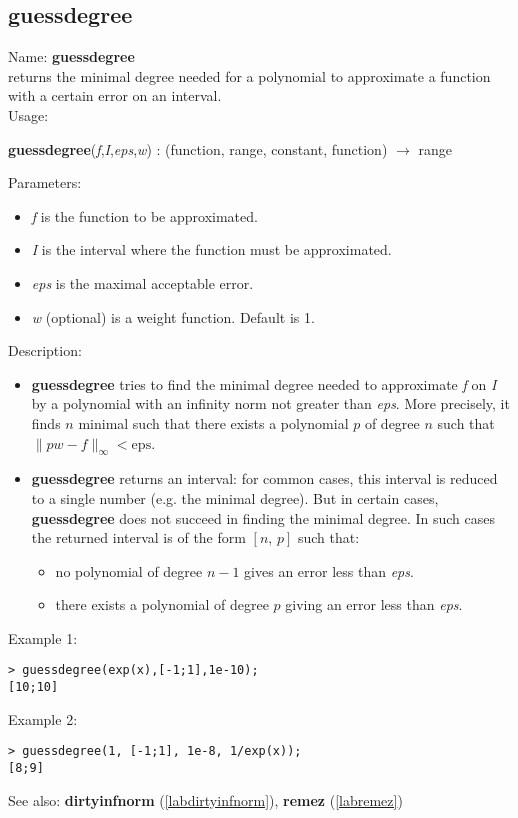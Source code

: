 \subsection{guessdegree}
\label{labguessdegree}
\noindent Name: \textbf{guessdegree}\\
returns the minimal degree needed for a polynomial to approximate a function with a certain error on an interval.\\
\noindent Usage: 
\begin{center}
\textbf{guessdegree}(\emph{f},\emph{I},\emph{eps},\emph{w}) : (\textsf{function}, \textsf{range}, \textsf{constant}, \textsf{function}) $\rightarrow$ \textsf{range}
\end{center}
Parameters: 
\begin{itemize}
\item \emph{f} is the function to be approximated.
\item \emph{I} is the interval where the function must be approximated.
\item \emph{eps} is the maximal acceptable error.
\item \emph{w} (optional) is a weight function. Default is 1.
\end{itemize}
\noindent Description: \begin{itemize}

\item \textbf{guessdegree} tries to find the minimal degree needed to approximate \emph{f}
   on \emph{I} by a polynomial with an infinity norm not greater than \emph{eps}.
   More precisely, it finds $n$ minimal such that there exists a
   polynomial $p$ of degree $n$ such that $\|pw-f\|_{\infty} < \mathrm{eps}$.

\item \textbf{guessdegree} returns an interval: for common cases, this interval is reduced to a 
   single number (e.g. the minimal degree). But in certain cases, \textbf{guessdegree} does
   not succeed in finding the minimal degree. In such cases the returned interval
   is of the form $[n,\,p]$ such that:
   \begin{itemize}
   \item no polynomial of degree $n-1$ gives an error less than \emph{eps}.
   \item there exists a polynomial of degree $p$ giving an error less than \emph{eps}. 
   \end{itemize}
\end{itemize}
\noindent Example 1: 
\begin{center}\begin{minipage}{15cm}\begin{Verbatim}[frame=single]
> guessdegree(exp(x),[-1;1],1e-10);
[10;10]
\end{Verbatim}
\end{minipage}\end{center}
\noindent Example 2: 
\begin{center}\begin{minipage}{15cm}\begin{Verbatim}[frame=single]
> guessdegree(1, [-1;1], 1e-8, 1/exp(x));
[8;9]
\end{Verbatim}
\end{minipage}\end{center}
See also: \textbf{dirtyinfnorm} (\ref{labdirtyinfnorm}), \textbf{remez} (\ref{labremez})
